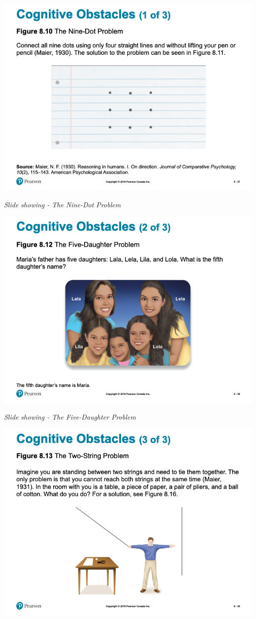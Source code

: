 \documentclass[
]{book}
\begin{document}
\begin{reflect}
\includegraphics{assets/unit_1/slide_57.png}

\emph{Slide showing - The Nine-Dot Problem}

\includegraphics{assets/unit_1/slide_58.png}

\emph{Slide showing - The Five-Daughter Problem}

\includegraphics{assets/unit_1/slide_59.png}


\end{reflect}
\end{document}
